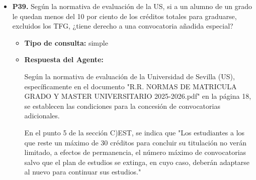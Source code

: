 \documentclass{article}
\begin{document}
\begin{itemize}
\begin{itemize}
                        Es importante destacar que, según la normativa, la bonificación se aplicará solo a los créditos que sean necesarios para la obtención del título conforme al plan de estudios y, en su caso, las especialidades y menciones vinculadas al título donde proceda la bonificación.

                        Además, se establece que la bonificación no se aplicará en los supuestos de reconocimiento de créditos, salvo en el caso de estudios realizados en Programas de Movilidad Estudiantil, ya sea en el marco de la Unión Europea, ya sea realizados mediante convenios específicos entre universidades y conforme al correspondiente acuerdo académico de movilidad firmado por los estudiantes.

                        En resumen, según la Normativa de Matrícula y Precios de la Universidad de Sevilla, los estudiantes que superen créditos en primera matrícula durante el curso anterior tienen derecho a una bonificación de matrícula, siempre y cuando cumplan con los requisitos establecidos en la normativa.
                  \item \textbf{Contexto utilizado:}

            \end{itemize}

      \item \textbf{P39.} Según la normativa de evaluación de la US, si a un alumno de un grado le quedan menos del 10 por ciento de los créditos totales para graduarse, excluidos los TFG, ¿tiene derecho a una convocatoria añadida especial? \\
            \begin{itemize}
                  \item \textbf{Tipo de consulta:} simple
                  \item \textbf{Respuesta del Agente:}

                        Según la normativa de evaluación de la Universidad de Sevilla (US), específicamente en el documento "R.R. NORMAS DE MATRICULA GRADO Y MASTER UNIVERSITARIO 2025-2026.pdf" en la página 18, se establecen las condiciones para la concesión de convocatorias adicionales.

                        En el punto 5 de la sección C)EST, se indica que "Los estudiantes a los que reste un máximo de 30 créditos para concluir su titulación no verán limitado, a efectos de permanencia, el número máximo de convocatorias salvo que el plan de estudios se extinga, en cuyo caso, deberán adaptarse al nuevo para continuar sus estudios."


\end{itemize}
\end{itemize}
\end{document}
